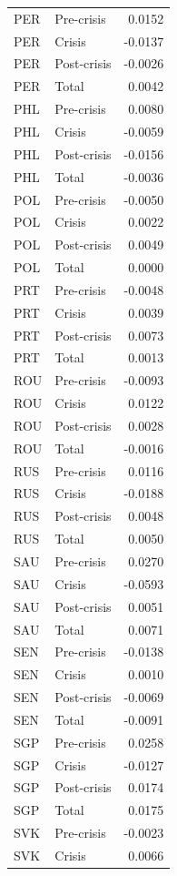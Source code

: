 \begin{longtable}[t]{llr}
PER & Pre-crisis & 0.0152\\
\addlinespace
PER & Crisis & -0.0137\\
PER & Post-crisis & -0.0026\\
PER & Total & 0.0042\\
PHL & Pre-crisis & 0.0080\\
PHL & Crisis & -0.0059\\
\addlinespace
PHL & Post-crisis & -0.0156\\
PHL & Total & -0.0036\\
POL & Pre-crisis & -0.0050\\
POL & Crisis & 0.0022\\
POL & Post-crisis & 0.0049\\
\addlinespace
POL & Total & 0.0000\\
PRT & Pre-crisis & -0.0048\\
PRT & Crisis & 0.0039\\
PRT & Post-crisis & 0.0073\\
PRT & Total & 0.0013\\
\addlinespace
ROU & Pre-crisis & -0.0093\\
ROU & Crisis & 0.0122\\
ROU & Post-crisis & 0.0028\\
ROU & Total & -0.0016\\
RUS & Pre-crisis & 0.0116\\
\addlinespace
RUS & Crisis & -0.0188\\
RUS & Post-crisis & 0.0048\\
RUS & Total & 0.0050\\
SAU & Pre-crisis & 0.0270\\
SAU & Crisis & -0.0593\\
\addlinespace
SAU & Post-crisis & 0.0051\\
SAU & Total & 0.0071\\
SEN & Pre-crisis & -0.0138\\
SEN & Crisis & 0.0010\\
SEN & Post-crisis & -0.0069\\
\addlinespace
SEN & Total & -0.0091\\
SGP & Pre-crisis & 0.0258\\
SGP & Crisis & -0.0127\\
SGP & Post-crisis & 0.0174\\
SGP & Total & 0.0175\\
\addlinespace
SVK & Pre-crisis & -0.0023\\
SVK & Crisis & 0.0066\\

\end{longtable}
